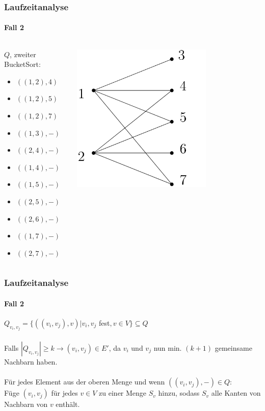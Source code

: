 \begin{frame}[t]
\frametitle{Laufzeitanalyse}
\framesubtitle{Fall 2}

\begin{columns}
	\begin{block}{$Q$, zweiter BucketSort:}
		\begin{itemize}
			\item $((1,2), 4)$
			\item $((1,2), 5)$
			\item $((1,2), 7)$
			\item $((1,3), -)$
			\item $((2,4), -)$
			\item $((1,4), -)$
			\item $((1,5), -)$
			\item $((2,5), -)$
			\item $((2,6), -)$
			\item $((1,7), -)$
			\item $((2,7), -)$
		\end{itemize}
	\end{block}
	
	\includegraphics[width=0.7\textwidth]{images/Graph_Queue_1.png}
\end{columns}
\end{frame}


\begin{frame}
\frametitle{Laufzeitanalyse}
\framesubtitle{Fall 2}

$Q_{v_i,v_j} = \{ ((v_i, v_j), v) | v_i, v_j$ fest$, v \in V \} \subseteq Q$ \\
\ \\
Falls $|Q_{v_i, v_j}| \geq k \rightarrow (v_i, v_j) \in E'$, da $v_i$ und $v_j$ nun min. $(k+1)$ gemeinsame Nachbarn haben. \\
\ \\
Für jedes Element aus der oberen Menge und wenn $((v_i, v_j), -) \in Q$: \\
Füge $(v_i, v_j)$ für jedes $v \in V$ zu einer Menge $S_v$ hinzu, sodass $S_v$ alle Kanten von Nachbarn von $v$ enthält.\\
\end{frame}


